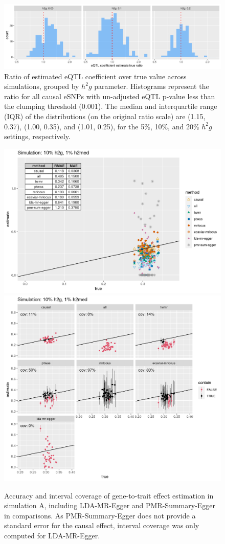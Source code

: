 \documentclass[11pt]{article}
\begin{document}
\begin{figure}[!ht]
  \centering
  \includegraphics[width=\textwidth]{figs/sim_overest}
  \caption{Ratio of estimated eQTL coefficient over true value across
    simulations, grouped by $h^2g$ parameter. Histograms represent the
    ratio for all causal eSNPs with un-adjusted eQTL p-value less than
    the clumping threshold (0.001). The median and interquartile
    range (IQR) of the distributions (on the original ratio scale) are
    (1.15, 0.37), (1.00, 0.35), and (1.01, 0.25), for
    the 5\%, 10\%, and 20\% $h^2g$ settings, respectively.}
\end{figure}

\begin{figure}[!ht]
  \centering
  \includegraphics[width=.5\textwidth]{figs/sim1extra2.png}
  \includegraphics[width=.4\textwidth]{figs/cover1extra2.png}
  \caption{Accuracy and interval coverage of gene-to-trait effect
    estimation in simulation A, including LDA-MR-Egger and
    PMR-Summary-Egger in comparisons. As PMR-Summary-Egger does not
    provide a standard error for the causal effect, interval
    coverage was only computed for LDA-MR-Egger.}
\end{figure}
\end{document}
